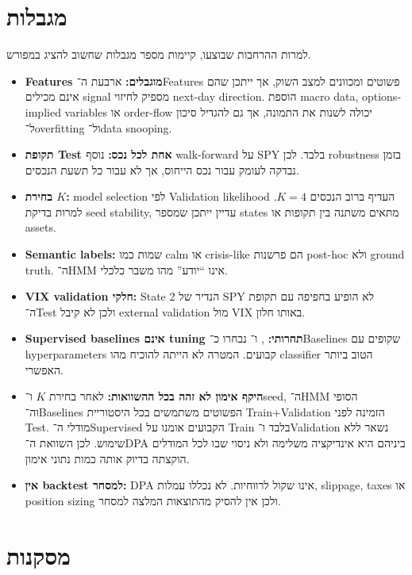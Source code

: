 \section{מגבלות}

למרות ההרחבות שבוצעו, קיימות מספר מגבלות שחשוב להציג במפורש.

\begin{itemize}
    \item \textbf{Features מוגבלים:} ארבעת ה־Features פשוטים ומכוונים למצב השוק, אך ייתכן שהם אינם מכילים signal מספיק לחיזוי next-day direction. הוספת macro data, options-implied variables או order-flow יכולה לשנות את התמונה, אך גם להגדיל סיכון ל־overfitting ול־data snooping.
    \item \textbf{תקופת Test אחת לכל נכס:} נוסף walk-forward על SPY בלבד. לכן robustness בזמן נבדקה לעומק עבור נכס הייחוס, אך לא עבור כל תשעת הנכסים.
    \item \textbf{בחירת \(K\):} model selection לפי Validation likelihood העדיף ברוב הנכסים \(K=4\). למרות בדיקת seed stability, עדיין ייתכן שמספר states מתאים משתנה בין תקופות או assets.
    \item \textbf{Semantic labels:} שמות כמו calm או crisis-like הם פרשנות post-hoc ולא ground truth. ה־HMM אינו ``יודע'' מהו משבר כלכלי.
    \item \textbf{VIX validation חלקי:} State 2 הנדיר של SPY לא הופיע בחפיפה עם תקופת ה־Test ולכן לא קיבל external validation מול VIX באותו חלון.
    \item \textbf{Supervised baselines אינם tuning תחרותי:} ,  ו־ נבחרו כ־Baselines שקופים עם hyperparameters קבועים. המטרה לא הייתה להוכיח מהו classifier הטוב ביותר האפשרי.
    \item \textbf{היקף אימון לא זהה בכל ההשוואות:} לאחר בחירת \(K\) ו־seed, ה־HMM הסופי וה־Baselines הפשוטים משתמשים בכל היסטוריית Train+Validation הזמינה לפני Test. מודלי ה־Supervised הקבועים אומנו על Train בלבד ו־Validation נשאר ללא שימוש. לכן השוואת ה־DPA ביניהם היא אינדיקציה משלימה ולא ניסוי שבו לכל המודלים הוקצתה בדיוק אותה כמות נתוני אימון.
    \item \textbf{אין backtest למסחר:} DPA אינו שקול לרווחיות. לא נכללו עמלות, slippage, taxes או position sizing ולכן אין להסיק מהתוצאות המלצה למסחר.
\end{itemize}

\section{מסקנות}

